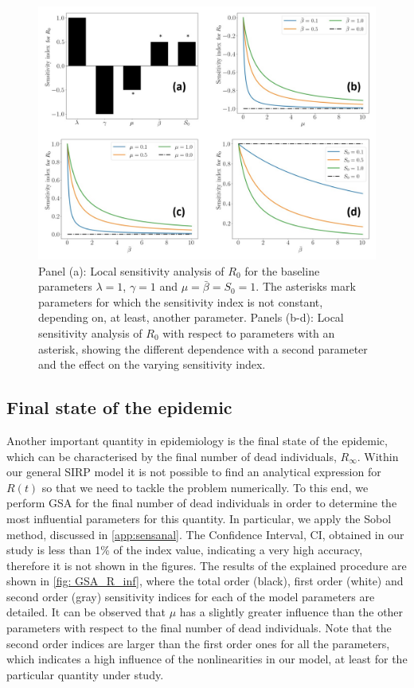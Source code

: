 \begin{figure}[H]
    \centering
    \includegraphics[width=\textwidth]{Figures/R_0_sensitivity.jpg}
    \caption{Panel (a): Local sensitivity analysis of $R_0$ for the
        baseline parameters $\lambda=1$, $\gamma=1$ and
        $\mu=\bar{\beta}=S_0=1$. The
        asterisks mark parameters for which the sensitivity index is not
        constant,
        depending on, at least, another parameter. Panels (b-d): Local
        sensitivity
        analysis of $R_0$ with respect to parameters with an asterisk, showing
        the
        different dependence with a second parameter and the effect on the
        varying
        sensitivity index.}
    \label{fig:Local_Sensitivity_Analysis_R0}
\end{figure}

\subsection{Final state of the epidemic}

Another important quantity in epidemiology is the final state of the
epidemic, which can be characterised by the final number of dead individuals,
$R_\infty$. Within our general SIRP model it is not possible to find an
analytical expression for $R(t)$ so that we need to tackle the problem
numerically. To this end, we perform GSA for the final number of dead
individuals in order to determine the most influential parameters for this
quantity. In particular, we apply the Sobol method, discussed in
\cref{app:sensanal}.
The Confidence Interval, CI, obtained in our
study is less than 1\% of the index value, indicating a very high accuracy,
therefore it is not shown in the figures. The results of the explained
procedure are shown in \cref{fig: GSA_R_inf}, where the total order (black),
first order (white) and second order (gray) sensitivity indices for each of the
model parameters are detailed. It can be observed that $\mu$ has a slightly
greater influence than the other parameters with respect to the final number of
dead individuals. Note that the second order indices are larger than the first
order ones for all the parameters, which indicates a high influence of the
nonlinearities in our model, at least for the particular quantity under study.

